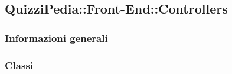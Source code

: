 \newpage
\subsection{QuizziPedia::Front-End::Controllers}
\subsubsection{Informazioni generali}
\subsubsection{Classi}
